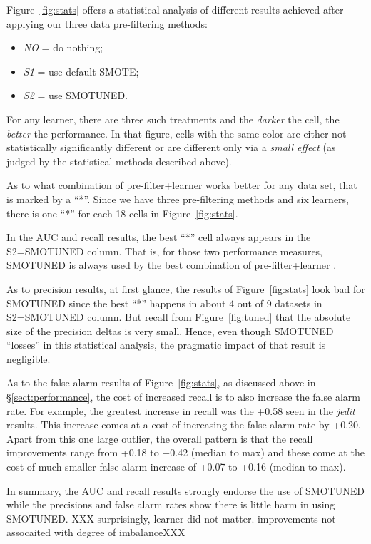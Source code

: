 \documentclass[10pt,conference]{IEEEtran}
\newcommand{\bi}{\begin{itemize}[leftmargin=0.4cm]}
\newcommand{\ei}{\end{itemize}}
\theoremstyle{break}
\theoremstyle{break}
\newcommand{\tion}[1]{{\S}\ref{sect:#1}}
\begin{document}
Figure~\ref{fig:stats} offers a statistical analysis
of different results achieved
after applying our three data pre-filtering methods:
\bi
\item  {\em NO} = do nothing;
\item {\em S1} = use default SMOTE;
\item {\em S2} = use SMOTUNED.
\ei
For any learner, there are three such treatments and the {\em darker} the cell, the {\em better} the performance. 
In that figure, cells with the same color are
either not statistically significantly different or
are different only via a {\em small effect}
(as judged by the statistical methods described above).

As to what combination of pre-filter+learner works better for any data set, that is marked by a ``*''. Since we have three pre-filtering methods and six learners, there is one   ``*'' for each 18 cells in Figure~\ref{fig:stats}.

In the  AUC and recall results,  the best ``*'' cell always appears in the S2=SMOTUNED column. 
That is, for those two performance measures,  SMOTUNED is always
used by the best combination of pre-filter+learner .

As to precision  results,  at first glance, the  results of Figure~\ref{fig:stats} look bad for SMOTUNED since
the best ``*''  happens in about 4 out of 9 datasets in S2=SMOTUNED column.
 But recall from Figure~\ref{fig:tuned} that the absolute size of the precision   deltas is very small.  Hence, even though SMOTUNED ``losses'' in this statistical analysis, the pragmatic impact of that result  is  negligible.
 
As to the false alarm results of Figure~\ref{fig:stats}, as discussed above in \tion{performance}, the cost of increased recall is to also increase
the false alarm rate. For example, the greatest increase in recall was the +0.58 seen in the {\em jedit} results. This increase comes at a cost
of increasing the false alarm rate by +0.20. Apart from this one large outlier, the overall pattern is that the recall improvements range from +0.18 to +0.42 (median to max)
and these come at the cost of much smaller false alarm increase of +0.07 to +0.16 (median to max). 
 
In summary, the AUC and recall results strongly endorse the  use of SMOTUNED
while the precisions and false alarm rates
show there is little harm in using SMOTUNED. 
XXX surprisingly, learner did not matter. improvements not assocaited
with degree of imbalanceXXX
\end{document}
